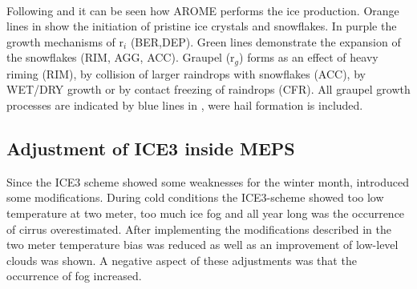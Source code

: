 \\
Following \citet{pinty_mixed-phased_1998} and  it can be seen how AROME performs the ice production. Orange lines in  show the initiation of pristine ice crystals and snowflakes. In purple the growth mechanisms of r$_i$ (BER,DEP). Green lines demonstrate the expansion of the snowflakes (RIM, AGG, ACC). Graupel (r$_g$) forms as an effect of heavy riming (RIM), by collision of larger raindrops with snowflakes (ACC), by WET/DRY growth or by contact freezing of raindrops (CFR). All graupel growth processes are indicated by blue lines in , were hail formation is included. 


%
\subsection{Adjustment of ICE3 inside MEPS}
Since the ICE3 scheme showed some weaknesses for the winter month, \citet{muller_arome-metcoop:_2017} introduced some modifications. 
During cold conditions the ICE3-scheme showed too low temperature at two meter, too much ice fog and all year long was the occurrence of cirrus overestimated. After implementing the modifications described in \citet{muller_arome-metcoop:_2017} the two meter temperature bias was reduced as well as an improvement of low-level clouds was shown. A negative aspect of these adjustments was that the occurrence of fog increased.%

